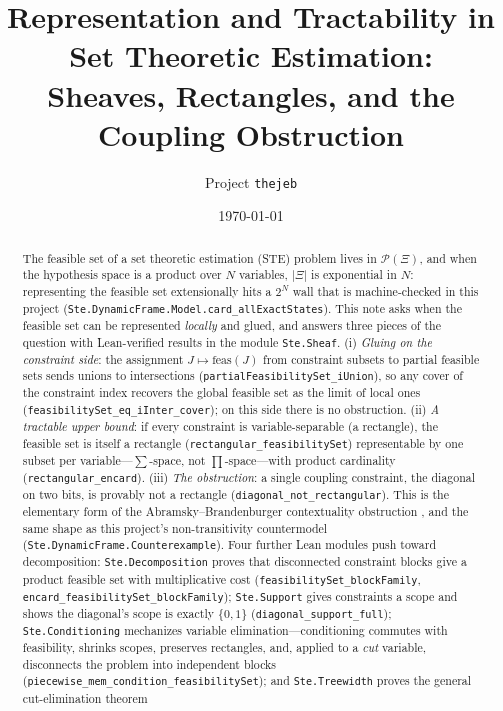 \documentclass[11pt]{article}
\title{Representation and Tractability in Set Theoretic Estimation:\\
Sheaves, Rectangles, and the Coupling Obstruction}
\author{Project \texttt{thejeb}}
\date{\today}
\newcommand{\lean}[1]{\texttt{#1}}
\newcommand{\feas}{\mathrm{feas}}
\newcommand{\Xii}{\Xi}
\begin{document}
\maketitle

\begin{abstract}
The feasible set of a set theoretic estimation (STE) problem
\citep{combettes1993} lives in $\mathcal{P}(\Xii)$, and when the
hypothesis space is a product over $N$ variables, $|\Xii|$ is
exponential in $N$: representing the feasible set extensionally hits a
$2^N$ wall that is machine-checked in this project
(\lean{Ste.DynamicFrame.Model.card\_allExactStates}).  This note asks
when the feasible set can be represented \emph{locally} and glued, and
answers three pieces of the question with Lean-verified results in the
module \lean{Ste.Sheaf}.  (i) \emph{Gluing on the constraint side}: the
assignment $J \mapsto \feas(J)$ from constraint subsets to partial
feasible sets sends unions to intersections
(\lean{partialFeasibilitySet\_iUnion}), so any cover of the constraint
index recovers the global feasible set as the limit of local ones
(\lean{feasibilitySet\_eq\_iInter\_cover}); on this side there is no
obstruction.  (ii) \emph{A tractable upper bound}: if every constraint is
variable-separable (a rectangle), the feasible set is itself a rectangle
(\lean{rectangular\_feasibilitySet}) representable by one subset per
variable---$\sum$-space, not $\prod$-space---with product cardinality
(\lean{rectangular\_encard}).  (iii) \emph{The obstruction}: a single
coupling constraint, the diagonal on two bits, is provably not a
rectangle (\lean{diagonal\_not\_rectangular}).  This is the elementary
form of the Abramsky--Brandenburger contextuality obstruction
\citep{abramsky2011sheaf}, and the same shape as this project's
non-transitivity countermodel
(\lean{Ste.DynamicFrame.Counterexample}).  Four further Lean modules
push toward decomposition: \lean{Ste.Decomposition} proves that
disconnected constraint blocks give a product feasible set with
multiplicative cost (\lean{feasibilitySet\_blockFamily},
\lean{encard\_feasibilitySet\_blockFamily}); \lean{Ste.Support} gives
constraints a scope and shows the diagonal's scope is exactly
$\{0,1\}$ (\lean{diagonal\_support\_full});
\lean{Ste.Conditioning} mechanizes variable elimination---conditioning
commutes with feasibility, shrinks scopes, preserves rectangles, and,
applied to a \emph{cut} variable, disconnects the problem into
independent blocks
(\lean{piecewise\_mem\_condition\_feasibilitySet}); and
\lean{Ste.Treewidth} proves the general cut-elimination theorem

\end{abstract}
\end{document}

